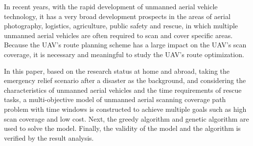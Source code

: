 \begin{eabstract}

  In recent years, with the rapid development of unmanned aerial vehicle technology,
   it has a very broad development prospects in the areas of aerial photography, logistics, 
   agriculture, public safety and rescue, in which multiple unmanned aerial vehicles are often required to scan and cover specific areas. 
   Because the UAV's route planning scheme has a large impact on the UAV's scan coverage, it is necessary and meaningful to study the UAV's route optimization.

  
  In this paper, based on the research status at home and abroad, taking the emergency relief scenario after a disaster as the background, 
  and considering the characteristics of unmanned aerial vehicles and the time requirements of rescue tasks, 
  a multi-objective model of unmanned aerial scanning coverage path problem with time windows is constructed to achieve multiple goals such as high scan coverage and low cost. 
  Next, the greedy algorithm and genetic algorithm are used to solve the model. Finally, the validity of the model and the algorithm is verified by the result analysis.

\end{eabstract}
